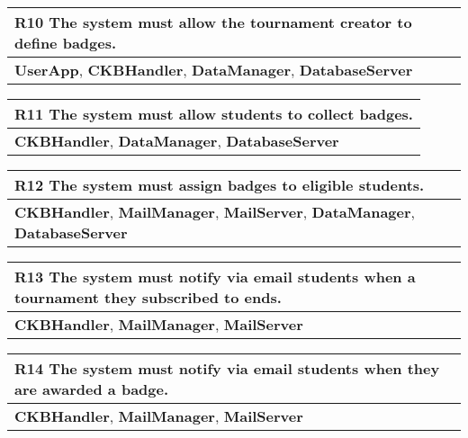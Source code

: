 \begin{table}[H]
    \begin{tabularx}{\textwidth}{X}
        \toprule
        \textbf{R10} The system must allow the tournament creator to define badges. \\ \midrule
        \textbf{UserApp}, \textbf{CKBHandler}, \textbf{DataManager}, \textbf{DatabaseServer}                    \\
    \end{tabularx}
\end{table}

\begin{table}[H]
    \begin{tabularx}{\textwidth}{X}
        \toprule
        \textbf{R11} The system must allow students to collect badges.  \\ \midrule
        \textbf{CKBHandler}, \textbf{DataManager}, \textbf{DatabaseServer}                     \\
    \end{tabularx}
\end{table}

\begin{table}[H]
    \begin{tabularx}{\textwidth}{X}
        \toprule
        \textbf{R12} The system must assign badges to eligible students. \\ \midrule
        \textbf{CKBHandler}, \textbf{MailManager}, \textbf{MailServer}, \textbf{DataManager}, \textbf{DatabaseServer}                     \\
    \end{tabularx}
\end{table}

\begin{table}[H]
    \begin{tabularx}{\textwidth}{X}
        \toprule
        \textbf{R13} The system must notify via email students when a tournament they subscribed to ends. \\ \midrule
        \textbf{CKBHandler}, \textbf{MailManager}, \textbf{MailServer}             \\
    \end{tabularx}
\end{table}

\begin{table}[H]
    \begin{tabularx}{\textwidth}{X}
        \toprule
        \textbf{R14} The system must notify via email students when they are awarded a badge. \\ \midrule
        \textbf{CKBHandler}, \textbf{MailManager}, \textbf{MailServer}             \\
    \end{tabularx}
\end{table}

